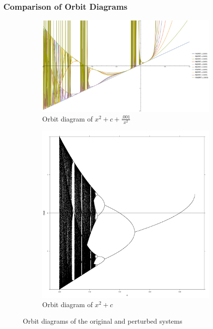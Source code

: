 \documentclass{beamer}
\newcommand{\<}{\left\langle}
\renewcommand{\>}{\right\rangle} %
\renewcommand{\*}{\cdot} %
\begin{document}
\begin{frame}
	\frametitle{Comparison of Orbit Diagrams}
	\begin{figure}[h]
		\centering
		\begin{subfigure}[b]{0.5\textwidth}
				\includegraphics[width=\textwidth]{./img/pert}
				\caption{Orbit diagram of $x^2 + c + \frac{.001}{x^2}$}
				\label{pert}
		\end{subfigure}%
		\begin{subfigure}[b]{0.5\textwidth}
				\includegraphics[width=\textwidth]{./img/orig}
				\caption{Orbit diagram of $x^2 + c$}
				\label{stand}%
		\end{subfigure}
		\caption{Orbit diagrams of the original and perturbed systems}\label{fig:orbits}
	\end{figure}
\end{frame}
\end{document}
